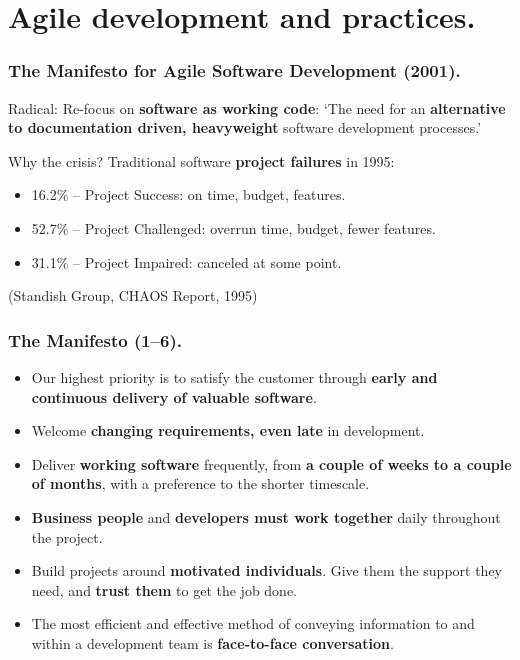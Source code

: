 \documentclass{beamer} %
\newcommand\emc[1]{\textcolor{midred}{\textbf{#1}}}
\begin{document}
\section{Agile development and practices.}

\begin{frame}
\frametitle{The Manifesto for Agile Software Development (2001).}

Radical: Re-focus on \emc{software as working code}: `The need for an \emc{alternative to documentation driven, heavyweight} software development processes.'

\vspace{5mm}
Why the crisis? Traditional software \emc{project failures} in 1995:
\begin{itemize}
  \item 16.2\% -- Project Success: on time, budget, features.
  \item 52.7\% -- Project Challenged: overrun time, budget, fewer features.
  \item 31.1\% -- Project Impaired: canceled at some point.
\end{itemize}
 (Standish Group, CHAOS Report, 1995)

\end{frame}

\begin{frame}
\frametitle{The Manifesto (1--6).}


\begin{itemize}
\item Our highest priority is to satisfy the customer
through \emc{early and continuous delivery
of valuable software}.

\item Welcome \emc{changing requirements, even late} in 
development. 

\item Deliver \emc{working software} frequently, from \emc{a 
couple of weeks to a couple of months}, with a 
preference to the shorter timescale.

\item \emc{Business people} and \emc{developers must work 
together} daily throughout the project.

\item Build projects around \emc{motivated individuals}. 
Give them the support they need, 
and \emc{trust them} to get the job done.

\item The most efficient and effective method of 
conveying information to and within a development 
team is \emc{face-to-face conversation}.

\end{itemize}

\end{frame}
\end{document}
